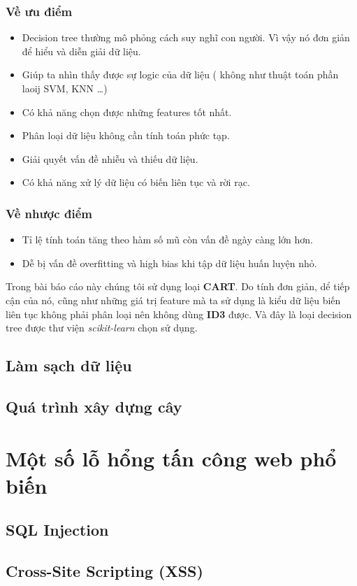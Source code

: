 \documentclass[../main-report.tex]{subfiles}
\begin{document}
\subsubsection*{Về ưu điểm}
\begin{itemize}
\item Decision tree thường mô phỏng cách suy nghĩ con người. Vì vậy nó đơn giản để hiểu và diễn giải dữ liệu.
\item Giúp ta nhìn thấy được sự logic của dữ liệu ( không như thuật toán phần laoij SVM, KNN …)
\item Có khả năng chọn được những features tốt nhất.
\item Phân loại dữ liệu không cần tính toán phức tạp.
\item Giải quyết vấn đề nhiễu và thiếu dữ liệu.
\item Có khả năng xử lý dữ liệu có biến liên tục và rời rạc.
\end{itemize}

\subsubsection*{Về nhược điểm}
\begin{itemize}
\item Tỉ lệ tính toán tăng theo hàm số mũ còn vấn đề ngày càng lớn hơn.
\item Dễ bị vấn đề overfitting và high bias khi tập dữ liệu huấn luyện nhỏ.
\end{itemize}

Trong bài báo cáo này chúng tôi sử dụng loại \textbf{CART}. Do tính đơn giản, dể tiếp cận của nó, cũng như những giá trị feature mà ta sử dụng là kiểu dữ liệu biến liên tục không phải phân loại nên không dùng \textbf{ID3} được. Và đây là loại decision tree được thư viện \textit{scikit-learn} chọn sử dụng.
\subsection{Làm sạch dữ liệu}

\subsection{Quá trình xây dựng cây}

\section{Một số lỗ hổng tấn công web phổ biến}
\subsection{SQL Injection}

\subsection{Cross-Site Scripting (XSS)}
\end{document}
